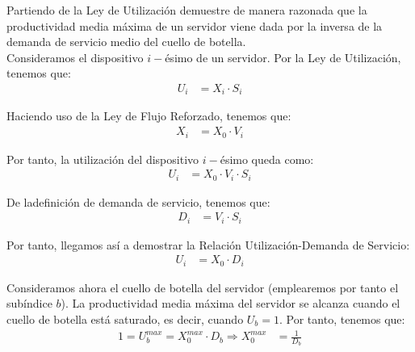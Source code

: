 \documentclass[12pt]{article}
\begin{document}
    \begin{ejercicio}[1 punto]
        Partiendo de la Ley de Utilización demuestre de manera razonada que la productividad media máxima de un servidor viene dada por la inversa de la demanda de servicio medio del cuello de botella.\\

        Consideramos el dispositivo $i-$ésimo de un servidor. Por la Ley de Utilización, tenemos que:
        \begin{align*}
            U_i &= X_i\cdot S_i
        \end{align*}

        Haciendo uso de la Ley de Flujo Reforzado, tenemos que:
        \begin{align*}
            X_i &= X_0\cdot V_i
        \end{align*}

        Por tanto, la utilización del dispositivo $i-$ésimo queda como:
        \begin{align*}
            U_i &= X_0\cdot V_i\cdot S_i
        \end{align*}

        De ladefinición de demanda de servicio, tenemos que:
        \begin{align*}
            D_i &= V_i\cdot S_i
        \end{align*}

        Por tanto, llegamos así a demostrar la Relación Utilización-Demanda de Servicio:
        \begin{align*}
            U_i &= X_0\cdot D_i
        \end{align*}

        Consideramos ahora el cuello de botella del servidor (emplearemos por tanto el subíndice $b$). La productividad media máxima del servidor se alcanza cuando el cuello de botella está saturado, es decir, cuando $U_b = 1$. Por tanto, tenemos que:
        \begin{align*}
            1 = U_b^{max} = X_0^{max}\cdot D_b
            \Longrightarrow
            X_0^{max} &= \frac{1}{D_b}
        \end{align*}
    \end{ejercicio}
\end{document}
